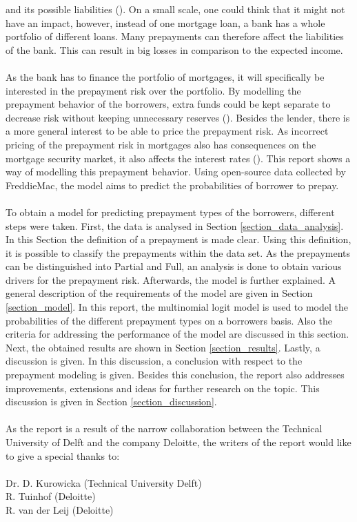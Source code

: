 and its possible liabilities (\cite{jacobs2005modelling}). 
On a small scale, one could think that it might not have an impact, however, instead of one 
mortgage loan, a bank has a whole portfolio of different loans. 
Many prepayments can therefore affect the liabilities of the bank. This 
can result in big losses in comparison to the expected income.  
\\\\
As the bank has to finance the portfolio of mortgages, it will
specifically be interested in the prepayment risk over the portfolio.
By modelling the prepayment behavior of the borrowers, extra funds could be 
kept separate to decrease risk without keeping unnecessary 
reserves (\cite{jacobs2005modelling}).
Besides the lender, there is a more general interest to be able 
to price the prepayment risk. As incorrect pricing of the prepayment risk 
in mortgages also has consequences on the mortgage security market, it also 
affects the interest rates (\cite{Chinloy1989}).  
This report shows a way of modelling this prepayment behavior. 
Using open-source data collected by FreddieMac, the model aims to predict 
the probabilities of borrower to prepay. 
\\\\
To obtain a model for predicting prepayment types of the borrowers, 
different steps were taken.
First, the data is analysed in Section \ref{section_data_analysis}. In 
this Section the definition of a prepayment is made clear. Using this 
definition, it is possible to classify the prepayments within the data set. 
As the prepayments can be distinguished into Partial and Full, an analysis is done to obtain 
various drivers for the prepayment risk. Afterwards, the model is further 
explained. A general description of the requirements of the model are given in 
Section \ref{section_model}. In this report, the multinomial logit 
model is used to model the probabilities of the different prepayment types on a borrowers basis. Also the criteria 
for addressing the performance of the model are discussed in this section.   
Next, the obtained results are shown in Section \ref{section_results}. Lastly, 
a discussion is given. In this discussion, a conclusion with respect to the 
prepayment modeling is given. Besides this conclusion, the report also addresses 
improvements, extensions and ideas for further research on the topic. 
This discussion is given in Section \ref{section_discussion}.
\\\\
As the report is a result of the narrow collaboration between the Technical 
University of Delft and the company Deloitte, the writers of the report would 
like to give a special thanks to:
\\\\
Dr. D. Kurowicka (Technical University Delft)  \\
R. Tuinhof (Deloitte)                           \\
R. van der Leij (Deloitte)
